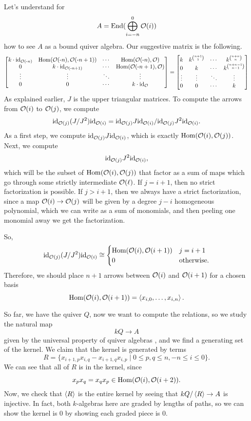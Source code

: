 \documentclass[12pt]{article}
\begin{document}
\begin{eg}
    Let's understand for
    \[A = \operatorname{End}(\bigoplus_{i=-n}^{0} \mathcal{O}(i))\]
    how to see $A$ as a bound quiver algebra. Our suggestive matrix is the following. 
    \[\begin{bmatrix}
        k\cdot \mathrm{id}_{\mathcal{O}(\text{-}n)} & \mathrm{Hom}(\mathcal{O}(\text{-}n),\mathcal{O}(\text{-}n+1)) & \cdots & \mathrm{Hom}(\mathcal{O}(\text{-}n),\mathcal{O})\\
        0 & k \cdot \mathrm{id}_{\mathcal{O}(\text{-}n+1)} & \cdots & \mathrm{Hom}(\mathcal{O}(\text{-}n+1),\mathcal{O})\\
        \vdots & \vdots & \ddots & \vdots\\
        0 & 0 & \cdots & k\cdot \mathrm{id}_{\mathcal{O}}
    \end{bmatrix}= \begin{bmatrix}
        k & k^{\binom{n+1}{1}} & \cdots & k^{\binom{n+n}{n}}\\
        0 & k & \cdots & k^{\binom{n+n-1}{n-1}}\\
        \vdots & \vdots & \ddots & \vdots\\
        0 & 0 & \cdots & k
    \end{bmatrix}\]
    As explained earlier, $J$ is the upper triangular matrices. To compute the arrows from $\mathcal{O}(i)$ to $\mathcal{O}(j)$, we compute
    \[\mathrm{id}_{\mathcal{O}(j)} (J/J^2) \mathrm{id}_{\mathcal{O}(i)} = \mathrm{id}_{\mathcal{O}(j)}J \mathrm{id}_{\mathcal{O}(i)}/ \mathrm{id}_{\mathcal{O}(j)} J^2 \mathrm{id}_{\mathcal{O}(i)}.\]
    As a first step, we compute $\mathrm{id}_{\mathcal{O}(j)} J \mathrm{id}_{\mathcal{O}(i)}$, which is exactly $\mathrm{Hom}(\mathcal{O}(i),\mathcal{O}(j))$. Next, we compute
    \[\mathrm{id}_{\mathcal{O}(j)} J^2 \mathrm{id}_{\mathcal{O}(i)},\]
    which will be the subset of $\mathrm{Hom}(\mathcal{O}(i),\mathcal{O}(j))$ that factor as a sum of maps which go through some strictly intermediate $\mathcal{O}(\ell)$. If $j=i+1$, then no strict factorization is possible. If $j>i+1$, then we always have a strict factorization, since a map $\mathcal{O}(i)\to \mathcal{O}(j)$ will be given by a degree $j-i$ homogeneous polynomial, which we can write as a sum of monomials, and then peeling one monomial away we get the factorization.

    So,
    \[\mathrm{id}_{\mathcal{O}(j)} (J/J^2) \mathrm{id}_{\mathcal{O}(i)} \cong \begin{cases}
        \mathrm{Hom}(\mathcal{O}(i), \mathcal{O}(i+1)) & j=i+1\\
        0 & \text{otherwise.}
    \end{cases}\]
    Therefore, we should place $n+1$ arrows between $\mathcal{O}(i)$ and $\mathcal{O}(i+1)$ for a chosen basis
    \[\mathrm{Hom}(\mathcal{O}(i),\mathcal{O}(i+1)) = \left\langle x_{i,0},\dots,x_{i,n}\right\rangle.\]

    So far, we have the quiver $Q$, now we want to compute the relations, so we study the natural map
    \[kQ \to A\]
    given by the universal property of quiver algebras \cite[II.1.8]{quiver}, and we find a generating set of the kernel. We claim that the kernel is generated by terms
    \[R=\{x_{i+1,p}x_{i,q} - x_{i+1,q}x_{i,p} \mid 0\leq p,q \leq n, -n \leq i \leq 0\}.\]
    We can see that all of $R$ is in the kernel, since
    \[x_{p}x_{q} = x_{q}x_{p} \in \mathrm{Hom}(\mathcal{O}(i),\mathcal{O}(i+2)).\]
    Now, we check that $\left\langle R\right\rangle$ is the entire kernel by seeing that $kQ/\left\langle R\right\rangle \to A$ is injective. In fact, both $k$-algebras here are graded by lengths of paths, so we can show the kernel is 0 by showing each graded piece is 0.


\end{eg}
\end{document}
